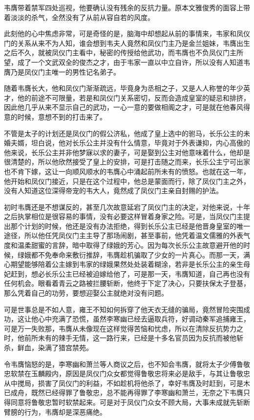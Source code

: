 韦膺带着禁军四处巡视，他要确认没有残余的反抗力量。原本文雅俊秀的面容上带着淡淡的杀气，全然没有了从前从容自若的风度。

此刻他的心中焦虑非常，可是奇怪的是，脑海中却想起从前的事情来，韦家和凤仪门的关系从来不为人知，谁会想到韦夫人竟然和凤仪门主乃是金兰姐妹，韦膺出生之后不久，就被凤仪门主看中，秘密的传授给他武功，而韦膺也不负凤仪门主所望，成了一个文武双全的俊杰之才，由于韦家一直以中立自许，所以没有人知道韦膺乃是凤仪门主唯一的男性记名弟子。

随着韦膺长大，他和凤仪门渐渐疏远，毕竟身为丞相之子，又是人人称誉的年少英才，他的前途不可限量，若是和凤仪门关系密切，反而会造成皇室的疑忌和排挤，因此他几乎从来不显示自己的武功，一心一意的要做相阁之才，可是就在他春风得意的时候，意想不到的打击来了。

不管是太子的计划还是凤仪门的假公济私，他成了皇上选中的驸马，长乐公主的未婚夫婿，坦白说，他对长乐公主并没有什么情意，毕竟对于外表谦抑，内心高傲的他来说，长乐公主并非他梦寐以求的妻子，可是娶到公主对他意味着什么，他却是很清楚的，所以他欣然接受了皇上的安排，可是打击随之而来，长乐公主宁可出家也不肯下嫁，这让一向顺风顺水的韦膺心中涌起前所未有的愤怒。也就在这一年，他开始和凤仪门接近，只是在这个过程中，他总是蒙面而行，除了凤仪门主之外，没有人知道这位深得帝宠的韦大人，竟然成了凤仪门主亲自封赐的护法。

初时韦膺还是不想谋反的，甚至几次故意延宕了凤仪门主的决定，对他来说，十年之后执掌相位是很容易的事情，没有必要这样冒着身家之险。可是，当凤仪门主提出那个计划的时候，他还是没有办法拒绝，得到长乐公主已经是他晋身皇室的唯一途径，所以他任凭凤仪门主主导了那场闹剧，甚至事前，他凭着温文儒雅的外表气度和温柔甜蜜的言辞，暗中取得了绿娥的芳心。因为每次长乐公主故意避开他的时候，绿娥都不免奉命来敷衍推辞，韦膺趁机骗取了少女的一片真心。而那一天，满心期望能够陪着公主嫁到韦家的绿娥果然处处装着糊涂，若非是长乐公主的亲生母妃赶到，想必长乐公主已经被迫嫁给他了，可是那一天，韦膺知道，自己再也没有任何机会。眼看着青云之路被拦腰斩断，他终于下定了决心，只要扶保太子登基，那么凭着自己的功劳，要想迎娶公主就绝对没有问题。

可是世事总是不如人意，雍王不知如何拆穿了他天衣无缝的骗局，竟然冒险突围成功，这让他心中充满了恐慌，虽然李寒幽已经去逼取兵符，好调动秦军追捕雍王，可是万一失败那，韦膺从未像现在这样觉得苦恼和忧虑，所以在清除反抗势力之时，他前所未有的辣手无情，这一路行来，已经是十多名官员因为反抗而被他斩杀，鲜血，染满了猎宫禁苑。

令韦膺恼怒的是，李寒幽和萧兰等人商议之后，也不知会韦膺，就将太子少傅鲁敬忠软禁在玉麟殿内，原因是凤仪门众女都觉得鲁敬忠将来必是敌手，与其让鲁敬忠从中搅局，损害了凤仪门的利益，不如趁机将他杀了，幸好韦膺及时赶到，可是木已成舟，既然已经得罪了鲁敬忠，总不能再得罪了李寒幽和萧兰，无奈之下韦膺只得同意将鲁敬忠暂时软禁起来。可是对于凤仪门众女不顾大局，大事未成就先斩断臂膀的行为，韦膺却是深恶痛绝。

